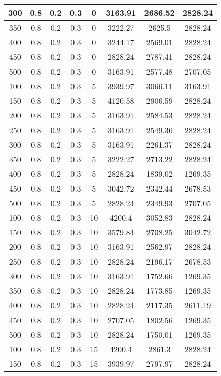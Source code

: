 \documentclass[a4paper, 12pt]{extreport}
\begin{document}
\begin{itemize}
\begin{longtable}{|c|c|c|c|c|c|c|c|}
			300 & 0.8 & 0.2 & 0.3 & 0 & 3163.91 & 2686.52 & 2828.24 \\\hline
			350 & 0.8 & 0.2 & 0.3 & 0 & 3222.27 & 2625.5 & 2828.24 \\\hline
			400 & 0.8 & 0.2 & 0.3 & 0 & 3244.17 & 2569.01 & 2828.24 \\\hline
			450 & 0.8 & 0.2 & 0.3 & 0 & 2828.24 & 2787.41 & 2828.24 \\\hline
			500 & 0.8 & 0.2 & 0.3 & 0 & 3163.91 & 2577.48 & 2707.05 \\\hline
			100 & 0.8 & 0.2 & 0.3 & 5 & 3939.97 & 3066.11 & 3163.91 \\\hline
			150 & 0.8 & 0.2 & 0.3 & 5 & 4120.58 & 2906.59 & 2828.24 \\\hline
			200 & 0.8 & 0.2 & 0.3 & 5 & 3163.91 & 2584.53 & 2828.24 \\\hline
			250 & 0.8 & 0.2 & 0.3 & 5 & 3163.91 & 2549.36 & 2828.24 \\\hline
			300 & 0.8 & 0.2 & 0.3 & 5 & 3163.91 & 2261.37 & 2828.24 \\\hline
			350 & 0.8 & 0.2 & 0.3 & 5 & 3222.27 & 2713.22 & 2828.24 \\\hline
			400 & 0.8 & 0.2 & 0.3 & 5 & 2828.24 & 1839.02 & 1269.35 \\\hline
			450 & 0.8 & 0.2 & 0.3 & 5 & 3042.72 & 2342.44 & 2678.53 \\\hline
			500 & 0.8 & 0.2 & 0.3 & 5 & 2828.24 & 2349.93 & 2707.05 \\\hline
			100 & 0.8 & 0.2 & 0.3 & 10 & 4200.4 & 3052.83 & 2828.24 \\\hline
			150 & 0.8 & 0.2 & 0.3 & 10 & 3579.84 & 2708.25 & 3042.72 \\\hline
			200 & 0.8 & 0.2 & 0.3 & 10 & 3163.91 & 2562.97 & 2828.24 \\\hline
			250 & 0.8 & 0.2 & 0.3 & 10 & 2828.24 & 2196.17 & 2678.53 \\\hline
			300 & 0.8 & 0.2 & 0.3 & 10 & 3163.91 & 1752.66 & 1269.35 \\\hline
			350 & 0.8 & 0.2 & 0.3 & 10 & 2828.24 & 1773.85 & 1269.35 \\\hline
			400 & 0.8 & 0.2 & 0.3 & 10 & 2828.24 & 2117.35 & 2611.19 \\\hline
			450 & 0.8 & 0.2 & 0.3 & 10 & 2707.05 & 1802.56 & 1269.35 \\\hline
			500 & 0.8 & 0.2 & 0.3 & 10 & 2828.24 & 1750.01 & 1269.35 \\\hline
			100 & 0.8 & 0.2 & 0.3 & 15 & 4200.4 & 2861.3 & 2828.24 \\\hline
			150 & 0.8 & 0.2 & 0.3 & 15 & 3939.97 & 2797.97 & 2828.24 \\\hline

\end{longtable}
\end{itemize}
\end{document}
